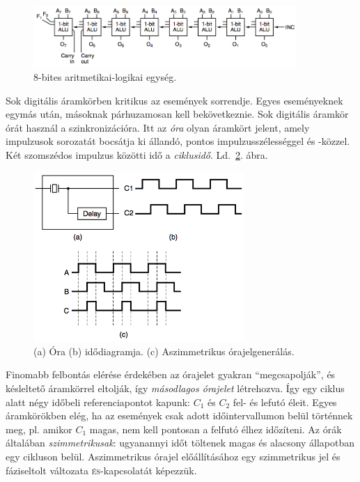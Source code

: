 \documentclass[a4paper]{article}
\begin{document}
\begin{figure}[htbp]
	\centering
		\includegraphics[width=10cm]{img/8bitalu}
	\caption{8-bites aritmetikai-logikai egység.\label{fig:8bitalu}}
\end{figure}

Sok digitális áramkörben kritikus az események sorrendje. Egyes eseményeknek egymás után, másoknak párhuzamosan kell bekövetkeznie. Sok digitális áramkör órát használ a szinkronizációra. Itt az \emph{óra} olyan áramkört jelent, amely impulzusok sorozatát bocsátja ki állandó, pontos impulzusszélességgel és -közzel. Két szomszédos impulzus közötti idő a \emph{ciklusidő}. Ld.~\ref{fig:ora}. ábra.

\begin{figure}[htbp]
	\centering
		\includegraphics[width=8cm]{img/ora}
	\caption{(a) Óra (b) idődiagramja. (c) Aszimmetrikus órajelgenerálás.\label{fig:ora}}
\end{figure}

Finomabb felbontás elérése érdekében az órajelet gyakran ``megcsapolják'', és késleltető áramkörrel eltolják, így \emph{másodlagos órajelet} létrehozva. Így egy ciklus alatt négy időbeli referenciapontot kapunk: $C_1$ és $C_2$ fel- és lefutó éleit. Egyes áramkörökben elég, ha az események csak adott időintervallumon belül történnek meg, pl. amikor $C_1$ magas, nem kell pontosan a felfutó élhez időzíteni. Az órák általában \emph{szimmetrikusak}: ugyanannyi időt töltenek magas és alacsony állapotban egy cikluson belül. Aszimmetrikus órajel előállításához egy szimmetrikus jel és fáziseltolt változata \textsc{és}-kapcsolatát képezzük.
\end{document}
